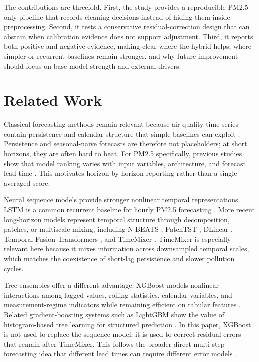 \documentclass[sn-mathphys-num]{sn-jnl}
\begin{document}
The contributions are threefold. First, the study provides a reproducible
PM2.5-only pipeline that records cleaning decisions instead of hiding them
inside preprocessing. Second, it tests a conservative residual-correction
design that can abstain when calibration evidence does not support adjustment.
Third, it reports both positive and negative evidence, making clear where the
hybrid helps, where simpler or recurrent baselines remain stronger, and why
future improvement should focus on base-model strength and external drivers.

\section{Related Work}
\label{sec:related}

Classical forecasting methods remain relevant because air-quality time series
contain persistence and calendar structure that simple baselines can exploit
\cite{hyndman2021fpp3}. Persistence and seasonal-naive forecasts are therefore
not placeholders; at short horizons, they are often hard to beat. For PM2.5
specifically, previous studies show that model ranking varies with input
variables, architecture, and forecast lead time \cite{beijing2021forecast}.
This motivates horizon-by-horizon reporting rather than a single averaged
score.

Neural sequence models provide stronger nonlinear temporal representations.
LSTM is a common recurrent baseline for hourly PM2.5 forecasting
\cite{hochreiter1997lstm,bai2019ensemble}. More recent long-horizon models
represent temporal structure through decomposition, patches, or multiscale
mixing, including N-BEATS \cite{oreshkin2020nbeats}, PatchTST
\cite{nie2023patchtst}, DLinear \cite{zeng2023dlinear}, Temporal Fusion
Transformers \cite{lim2021temporal}, and TimeMixer
\cite{wang2024timemixer}. TimeMixer is especially relevant here because it
mixes information across downsampled temporal scales, which matches the
coexistence of short-lag persistence and slower pollution cycles.

Tree ensembles offer a different advantage. XGBoost models nonlinear
interactions among lagged values, rolling statistics, calendar variables, and
measurement-regime indicators while remaining efficient on tabular features
\cite{chen2016xgboost}. Related gradient-boosting systems such as LightGBM
show the value of histogram-based tree learning for structured prediction
\cite{ke2017lightgbm}. In this paper, XGBoost is not used to replace the
sequence model; it is used to correct residual errors that remain after
TimeMixer. This follows the broader direct multi-step forecasting idea that
different lead times can require different error models
\cite{taieb2012review}.
\end{document}
